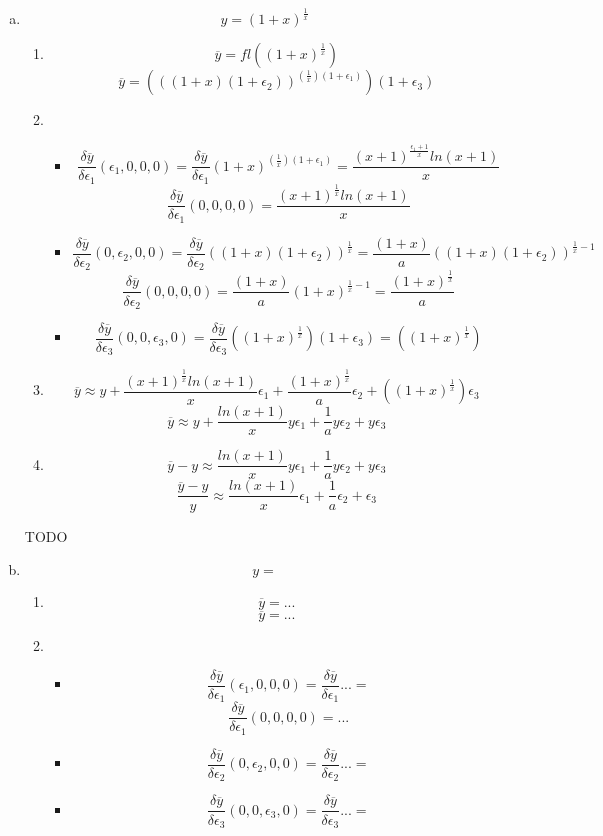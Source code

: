 \documentclass[12pt,a4paper]{article}
\begin{document}
\begin{enumerate}[(a)]
\item
\[
y= (1+x)^{\frac{1}{x}}
\]
\begin{enumerate}[1.]
\item
\[
\overline{y} = fl\left((1+x)^{\frac{1}{x}}\right)
\]
\[
\overline{y} = \left(((1+x)(1+\epsilon_2))^{\left(\frac{1}{x}\right)(1+\epsilon_1)}\right)(1+\epsilon_3)
\]
\item
\begin{itemize}
\item
\[
\frac{\delta\overline{y}}{\delta\epsilon_1}(\epsilon_1,0,0,0)
= \frac{\delta\overline{y}}{\delta\epsilon_1}
(1+x)^{\left(\frac{1}{x}\right)(1+\epsilon_1)}
= \frac{(x+1)^{\frac{\epsilon_1+1}{x}}ln(x+1)}{x}
\]
\[
\frac{\delta\overline{y}}{\delta\epsilon_1}(0,0,0,0)
= \frac{(x+1)^{\frac{1}{x}}ln(x+1)}{x}
\]
\item
\[
\frac{\delta\overline{y}}{\delta\epsilon_2}(0,\epsilon_2,0,0)
= \frac{\delta\overline{y}}{\delta\epsilon_2}
((1+x)(1+\epsilon_2))^{\frac{1}{x}}
= \frac{(1+x)}{a}((1+x)(1+\epsilon_2))^{\frac{1}{x}-1}
\]
\[
\frac{\delta\overline{y}}{\delta\epsilon_2}(0,0,0,0)
= \frac{(1+x)}{a}(1+x)^{\frac{1}{x}-1}
=\frac{(1+x)^{\frac{1}{x}}}{a}
\]
\item
\[
\frac{\delta\overline{y}}{\delta\epsilon_3}(0,0,\epsilon_3,0)
= \frac{\delta\overline{y}}{\delta\epsilon_3}
\left((1+x)^{\frac{1}{x}}\right)(1+\epsilon_3)
= \left((1+x)^{\frac{1}{x}}\right)
\]

\end{itemize}
\item
\[
\overline{y} \approx y +
\frac{(x+1)^{\frac{1}{x}}ln(x+1)}{x} \epsilon_1
+
\frac{(1+x)^{\frac{1}{x}}}{a}\epsilon_2
+
\left((1+x)^{\frac{1}{x}}\right) \epsilon_3
\]
\[
\overline{y} \approx y +
\frac{ln(x+1)}{x}y \epsilon_1
+ \frac{1}{a}y \epsilon_2
+ y \epsilon_3
\]
\item
\[
\overline{y} - y \approx 
\frac{ln(x+1)}{x}y \epsilon_1
+ \frac{1}{a}y \epsilon_2
+ y \epsilon_3
\]
\[
\frac{\overline{y}-y}{y} \approx 
\frac{ln(x+1)}{x} \epsilon_1
+ \frac{1}{a} \epsilon_2
+ \epsilon_3
\]
\end{enumerate}

TODO
\item
\[
y= 
\]
\begin{enumerate}[1.]
\item
\[
\overline{y} = ...
\]
\[
\overline{y} = ...
\]
\item
\begin{itemize}
\item
\[
\frac{\delta\overline{y}}{\delta\epsilon_1}(\epsilon_1,0,0,0)
= \frac{\delta\overline{y}}{\delta\epsilon_1}
...
= 
\]
\[
\frac{\delta\overline{y}}{\delta\epsilon_1}(0,0,0,0)
= ...
\]
\item
\[
\frac{\delta\overline{y}}{\delta\epsilon_2}(0,\epsilon_2,0,0)
= \frac{\delta\overline{y}}{\delta\epsilon_2}
...
= 
\]
\item
\[
\frac{\delta\overline{y}}{\delta\epsilon_3}(0,0,\epsilon_3,0)
= \frac{\delta\overline{y}}{\delta\epsilon_3}
...
= 
\]


\end{itemize}
\end{enumerate}
\end{enumerate}
\end{document}
